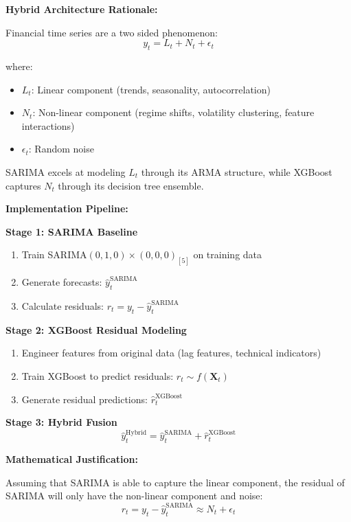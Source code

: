 \textbf{Hybrid Architecture Rationale:}

Financial time series are a two sided phenomenon:
\begin{equation}
y_t = L_t + N_t + \epsilon_t
\end{equation}

where:
\begin{itemize}
    \item $L_t$: Linear component (trends, seasonality, autocorrelation)
    \item $N_t$: Non-linear component (regime shifts, volatility clustering, feature interactions)
    \item $\epsilon_t$: Random noise
\end{itemize}

SARIMA excels at modeling $L_t$ through its ARMA structure, while XGBoost captures $N_t$ through its decision tree ensemble.

\textbf{Implementation Pipeline:}

\textbf{Stage 1: SARIMA Baseline}
\begin{enumerate}
    \item Train SARIMA$(0,1,0) \times (0,0,0)_{[5]}$ on training data
    \item Generate forecasts: $\hat{y}_t^{\text{SARIMA}}$
    \item Calculate residuals: $r_t = y_t - \hat{y}_t^{\text{SARIMA}}$
\end{enumerate}

\textbf{Stage 2: XGBoost Residual Modeling}
\begin{enumerate}
    \item Engineer features from original data (lag features, technical indicators)
    \item Train XGBoost to predict residuals: $r_t \sim f(\mathbf{X}_t)$
    \item Generate residual predictions: $\hat{r}_t^{\text{XGBoost}}$
\end{enumerate}

\textbf{Stage 3: Hybrid Fusion}
\begin{equation}
\hat{y}_t^{\text{Hybrid}} = \hat{y}_t^{\text{SARIMA}} + \hat{r}_t^{\text{XGBoost}}
\end{equation}

\textbf{Mathematical Justification:}

Assuming that SARIMA is able to capture the linear component, the residual of SARIMA will only have the non-linear component and noise:
\begin{equation}
r_t = y_t - \hat{y}_t^{\text{SARIMA}} \approx N_t + \epsilon_t
\end{equation}

